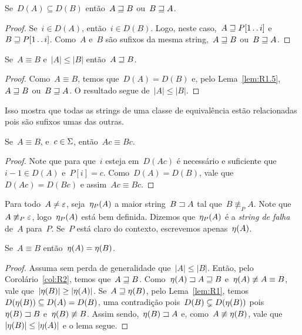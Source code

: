 \begin{lemma}
\label{lem:R1.5}
Se~$D(A) \subseteq D(B)$ então~$A \sqsupseteq B$ ou~$B \sqsupseteq A$.
\end{lemma}

\begin{proof}
Se~$i \in D(A)$, então~$i \in D(B)$. Logo, neste caso,~$A \sqsupseteq P[1\,.\,.\, i]$  e~$B \sqsupseteq P[1\,.\,.\, i]$. Como~$A$ e~$B$ são sufixos da mesma string,~$A \sqsupseteq B$ ou~$B \sqsupseteq A$.
\end{proof}

\begin{corollary}
\label{col:R2}
Se~$A \equiv B$ e~$|A| \leq |B|$ então~$A \sqsupseteq B$.
\end{corollary}

\begin{proof}
Como~$A \equiv B$, temos que~$D(A) = D(B)$ e, pelo Lema~\ref{lem:R1.5},~$A \sqsupseteq B$ ou~$B \sqsupseteq A$. O resultado segue de~$|A| \leq |B|$.
\end{proof}

Isso mostra que todas as strings de uma classe de equivalência estão relacionadas pois são sufixos umas das outras.

\begin{prop} \label{prop:classc}
Se~$A \equiv B$, e~$c \in \Sigma$, então~$Ac \equiv Bc$.
\end{prop}

\begin{proof}
Note que para que~$i$ esteja em~$D(Ac)$ é necessário e suficiente que~${i-1 \in D(A)}$ e~${P[i] = c}$. Como~$D(A) = D(B)$, vale que~$D(Ac) = D(Bc)$ e assim~$Ac \equiv Bc$.
\end{proof}

Para todo~$A \neq \varepsilon$, seja~$\eta_P(A)$ a maior string~$B \sqsupset A$ tal que~$B \not\equiv_P A$. Note que~$A \not\equiv_P \varepsilon$, logo~$\eta_P(A)$ está bem definida. Dizemos que~$\eta_P(A)$ é a \emph{string de falha} de~$A$ para~$P$. Se~$P$ está claro do contexto, escrevemos apenas~$\eta(A)$.

\begin{lemma}
\label{lem:R4}
Se~$A \equiv B$ então~$\eta(A) = \eta(B)$.
\end{lemma}

\begin{proof}
Assuma sem perda de generalidade que~$|A| \leq |B|$. Então, pelo Corolário~\ref{col:R2}, temos que~$A \sqsupseteq B$.
Como~$\eta(A) \sqsupset A \sqsupseteq B$ e~$\eta(A) \not\equiv A \equiv B$, vale que~$|\eta(B)| \geq|\eta(A)|$.
Se~${A \sqsupseteq \eta(B)}$, pelo Lema~\ref{lem:R1}, temos~$D(\eta(B)) \subseteq D(A) = D(B)$, uma contradição pois~$D(B) \subsetneq D(\eta(B))$ pois~$\eta(B) \sqsupset B$ e~$\eta(B) \not\equiv B$.
Assim sendo,~$\eta(B) \sqsupset A$ e, como~$A \not\equiv \eta(B)$, vale que~$|\eta(B)| \leq |\eta(A)|$ e o lema segue.
\end{proof}

